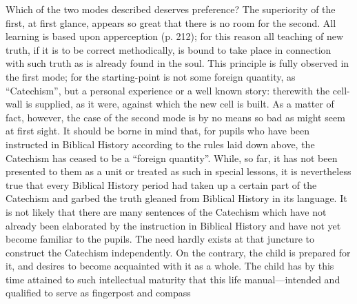 Which of the two modes described deserves preference? The superiority of the first, at first glance, appears so great that there is no room for the second. All learning is based upon apperception (p. 212); for this reason all teaching of new truth, if it is to be correct methodically, is bound to take place in connection with such truth as is already found in the soul. This principle is fully observed in the first mode; for the starting-point is not some foreign quantity, as “Catechism”, but a personal experience or a well known story: therewith the cell-wall is supplied, as it were, against which the new cell is built. As a matter of fact, however, the case of the second mode is by no means so bad as might seem at first sight. It should be borne in mind that, for pupils who have been instructed in Biblical History according to the rules laid down above, the Catechism has ceased to be a “foreign quantity”. While, so far, it has not been presented to them as a unit or treated as such in special lessons, it is nevertheless true that every Biblical History period had taken up a certain part of the Catechism and garbed the truth gleaned from Biblical History in its language. It is not likely that there are many sentences of the Catechism which have not already been elaborated by the instruction in Biblical History and have not yet become familiar to the pupils. The need hardly exists at that juncture to construct the Catechism independently. On the contrary, the child is prepared for it, and desires to become acquainted with it as a whole. The child has by this time attained to such intellectual maturity that this life manual—intended and qualified to serve as fingerpost and compass
